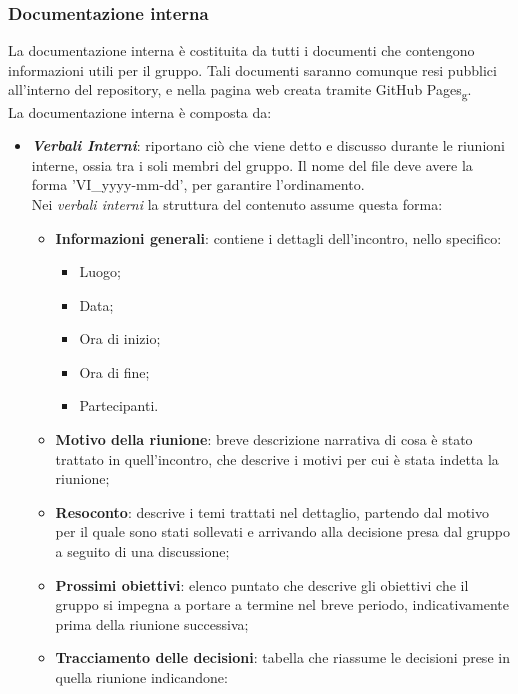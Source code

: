 \subsubsection{Documentazione interna}
La documentazione interna è costituita da tutti i documenti che contengono
informazioni utili per il gruppo. Tali documenti saranno comunque resi pubblici
all'interno del repository, e nella pagina web creata tramite GitHub
Pages\textsubscript{g}.\\ La documentazione interna è composta da:
\begin{itemize}
      \item \textit{\textbf{Verbali Interni}}: riportano ciò che viene detto e discusso durante le riunioni interne, ossia tra i soli membri del gruppo.
            Il nome del file deve avere la forma 'VI\_yyyy-mm-dd', per garantire l'ordinamento.
            \\Nei \textit{verbali interni} la struttura del contenuto assume questa forma:
            \begin{itemize}
                  \item \textbf{Informazioni generali}: contiene i dettagli dell'incontro, nello specifico:
                        \begin{itemize}
                              \item Luogo;
                              \item Data;
                              \item Ora di inizio;
                              \item Ora di fine;
                              \item Partecipanti.
                        \end{itemize}
                  \item \textbf{Motivo della riunione}: breve descrizione narrativa di cosa è stato trattato in quell'incontro, che descrive i motivi per cui è stata indetta la riunione;
                  \item \textbf{Resoconto}: descrive i temi trattati nel dettaglio, partendo dal motivo per il quale sono stati sollevati e arrivando alla decisione presa dal gruppo a seguito di una discussione;
                  \item \textbf{Prossimi obiettivi}: elenco puntato che descrive gli obiettivi che il gruppo si impegna a portare a termine nel breve periodo, indicativamente prima della riunione successiva;
                  \item \textbf{Tracciamento delle decisioni}: tabella che riassume le decisioni prese in quella riunione indicandone:

\end{itemize}
\end{itemize}
